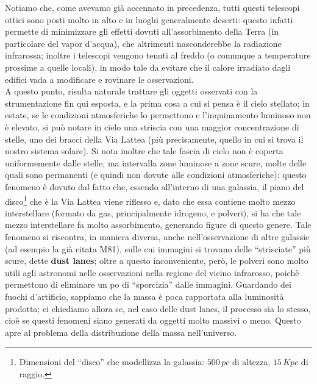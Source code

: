 Notiamo che, come avevamo già accennato in precedenza, tutti questi telescopi ottici sono posti molto in alto e in luoghi generalmente deserti: questo infatti permette di minimizzare gli effetti dovuti all'assorbimento della Terra (in particolare del vapor d'acqua), che altrimenti nasconderebbe la radiazione infrarossa; inoltre i telescopi vengono tenuti al freddo (o comunque a temperature prossime a quelle locali), in modo tale da evitare che il calore irradiato dagli edifici vada a modificare e rovinare le osservazioni.
\\

A questo punto, risulta  naturale trattare gli oggetti osservati con la strumentazione fin qui esposta, e la prima cosa a cui si pensa è il cielo stellato; in estate, se le condizioni atmosferiche lo permettono e l'inquinamento luminoso non è elevato, si può notare in cielo una striscia con una maggior concentrazione di stelle, uno dei bracci della Via Lattea (più precisamente, quello in cui si trova il nostro sistema solare). Si nota inoltre che tale fascia di cielo non è coperta uniformemente dalle stelle, ma intervalla zone luminose a zone scure, molte delle quali sono permanenti (e quindi non dovute alle condizioni atmosferiche): questo fenomeno è dovuto dal fatto che, essendo all'interno di una galassia, il piano del disco\footnote{Dimensioni del ``disco'' che modellizza la galassia: $500 \, pc$ di altezza, $15 \, Kpc$ di raggio.} che è la Via Lattea viene riflesso e, dato che essa contiene molto mezzo interstellare (formato da gas, principalmente idrogeno, e polveri), si ha che tale mezzo interstellare fa molto assorbimento, generando figure di questo genere. Tale fenomeno si riscontra, in maniera diversa, anche nell'osservazione di altre galassie (ad esempio la già citata M81), sulle cui immagini si trovano delle ``strisciate'' più scure, dette \textbf{dust lanes}; oltre a questo inconveniente, però, le polveri sono molto utili agli astronomi nelle osservazioni nella regione del vicino infrarosso, poichè permettono di eliminare un po di ``sporcizia'' dalle immagini. Guardando dei fuochi d'artificio, sappiamo che la massa è poca rapportata alla luminosità prodotta; ci chiediamo allora se, nel caso delle dust lanes,  il processo sia lo stesso, cioè se questi fenomeni siano generati da oggetti molto massivi o meno. Questo apre al problema della distribuzione della massa nell'universo.

